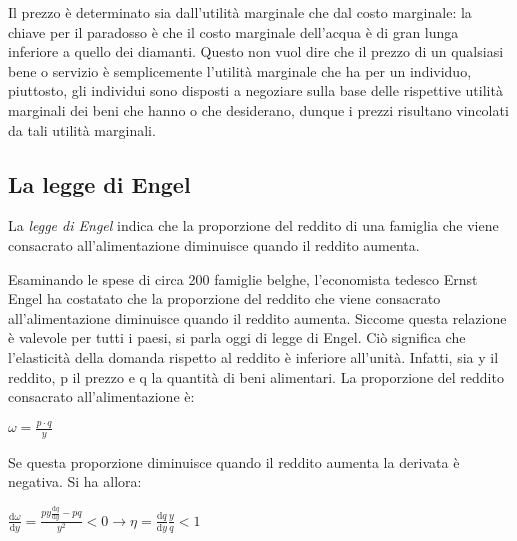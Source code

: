 Il prezzo è determinato sia dall'utilità marginale che dal costo marginale: la 
chiave per il paradosso è che il costo marginale dell'acqua è di gran 
lunga inferiore a quello dei diamanti.
Questo non vuol dire che il prezzo di un qualsiasi bene o servizio è 
semplicemente l'utilità marginale che ha per un individuo, piuttosto, gli 
individui sono disposti a negoziare sulla base delle rispettive utilità 
marginali dei beni che hanno o che desiderano, dunque i prezzi risultano 
vincolati da tali utilità marginali.

% 
% 
% 




\subsection{La legge di Engel}

La \emph{legge di Engel} indica che la proporzione del reddito di una famiglia 
che viene consacrato all'alimentazione diminuisce quando il reddito aumenta.

Esaminando le spese di circa 200 famiglie belghe, l'economista tedesco Ernst 
Engel ha costatato che la proporzione del reddito che viene consacrato 
all'alimentazione diminuisce quando il reddito aumenta. 
Siccome questa relazione è valevole per tutti i paesi, si parla oggi di legge di 
Engel.
Ciò significa che l'elasticità della domanda rispetto al reddito è inferiore 
all'unità. Infatti, sia y il reddito, p il prezzo e q la quantità 
di beni alimentari. La proporzione del reddito consacrato all'alimentazione è:

\(  \omega = \frac{p \cdot q}{y} \)

Se questa proporzione diminuisce quando il reddito aumenta la derivata è 
negativa. Si ha allora:

\( \frac{\mathrm{d} \omega}{\mathrm{d} y}=\frac{py \frac{\mathrm{d} 
q}{\mathrm{d} y}-p q}{y^2} < 0  \rightarrow \eta = \frac{\mathrm{d} 
q}{\mathrm{d} y}\frac{y}{q} < 1 \)

